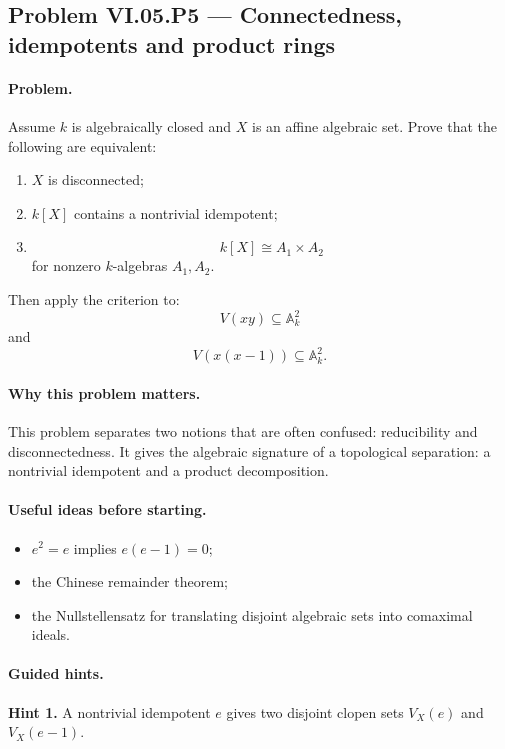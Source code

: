 \subsection*{Problem VI.05.P5 --- Connectedness, idempotents and product rings}
\label{prob:vi-05-p5}

\paragraph{Problem.}
\label{prob:vi05-p5}
Assume \(k\) is algebraically closed and \(X\) is an affine algebraic set.  Prove that the
following are equivalent:
\begin{enumerate}
  \item \(X\) is disconnected;
  \item \(k[X]\) contains a nontrivial idempotent;
  \item
        \[
        k[X]\cong A_1\times A_2
        \]
        for nonzero \(k\)-algebras \(A_1,A_2\).
\end{enumerate}

Then apply the criterion to:
\[
V(xy)\subseteq\mathbb A_k^2
\]
and
\[
V(x(x-1))\subseteq\mathbb A_k^2.
\]

\ifdefined\FullProblemDossiers

\paragraph{Why this problem matters.}
This problem separates two notions that are often confused: reducibility and
disconnectedness.  It gives the algebraic signature of a topological separation: a
nontrivial idempotent and a product decomposition.

\paragraph{Useful ideas before starting.}
\begin{itemize}
\item \(e^2=e\) implies \(e(e-1)=0\);
\item the Chinese remainder theorem;
\item the Nullstellensatz for translating disjoint algebraic sets into comaximal ideals.
\end{itemize}

\paragraph{Guided hints.}
\textbf{Hint 1.} A nontrivial idempotent \(e\) gives two disjoint clopen sets
\(V_X(e)\) and \(V_X(e-1)\).

